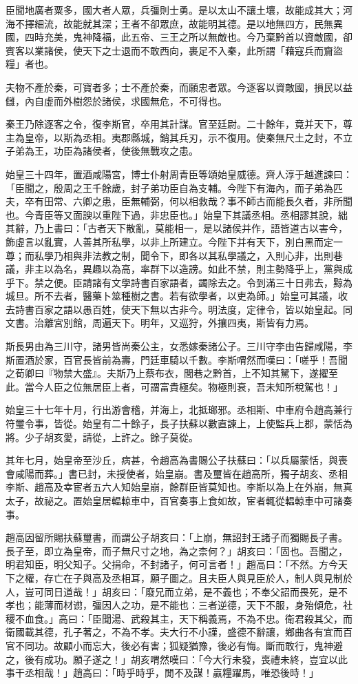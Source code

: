 \begin{pinyinscope}
臣聞地廣者粟多，國大者人眾，兵彊則士勇。是以太山不讓土壤，故能成其大；河海不擇細流，故能就其深；王者不卻眾庶，故能明其德。是以地無四方，民無異國，四時充美，鬼神降福，此五帝、三王之所以無敵也。今乃棄黔首以資敵國，卻賓客以業諸侯，使天下之士退而不敢西向，裹足不入秦，此所謂「藉寇兵而齎盜糧」者也。

夫物不產於秦，可寶者多；士不產於秦，而願忠者眾。今逐客以資敵國，損民以益讎，內自虛而外樹怨於諸侯，求國無危，不可得也。

秦王乃除逐客之令，復李斯官，卒用其計謀。官至廷尉。二十餘年，竟并天下，尊主為皇帝，以斯為丞相。夷郡縣城，銷其兵刃，示不復用。使秦無尺土之封，不立子弟為王，功臣為諸侯者，使後無戰攻之患。

始皇三十四年，置酒咸陽宮，博士仆射周青臣等頌始皇威德。齊人淳于越進諫曰：「臣聞之，殷周之王千餘歲，封子弟功臣自為支輔。今陛下有海內，而子弟為匹夫，卒有田常、六卿之患，臣無輔弼，何以相救哉？事不師古而能長久者，非所聞也。今青臣等又面諛以重陛下過，非忠臣也。」始皇下其議丞相。丞相謬其說，絀其辭，乃上書曰：「古者天下散亂，莫能相一，是以諸侯并作，語皆道古以害今，飾虛言以亂實，人善其所私學，以非上所建立。今陛下并有天下，別白黑而定一尊；而私學乃相與非法教之制，聞令下，即各以其私學議之，入則心非，出則巷議，非主以為名，異趣以為高，率群下以造謗。如此不禁，則主勢降乎上，黨與成乎下。禁之便。臣請諸有文學詩書百家語者，蠲除去之。令到滿三十日弗去，黥為城旦。所不去者，醫藥卜筮種樹之書。若有欲學者，以吏為師。」始皇可其議，收去詩書百家之語以愚百姓，使天下無以古非今。明法度，定律令，皆以始皇起。同文書。治離宮別館，周遍天下。明年，又巡狩，外攘四夷，斯皆有力焉。

斯長男由為三川守，諸男皆尚秦公主，女悉嫁秦諸公子。三川守李由告歸咸陽，李斯置酒於家，百官長皆前為壽，門廷車騎以千數。李斯喟然而嘆曰：「嗟乎！吾聞之荀卿曰『物禁大盛』。夫斯乃上蔡布衣，閭巷之黔首，上不知其駑下，遂擢至此。當今人臣之位無居臣上者，可謂富貴極矣。物極則衰，吾未知所稅駕也！」

始皇三十七年十月，行出游會稽，并海上，北抵瑯邪。丞相斯、中車府令趙高兼行符璽令事，皆從。始皇有二十餘子，長子扶蘇以數直諫上，上使監兵上郡，蒙恬為將。少子胡亥愛，請從，上許之。餘子莫從。

其年七月，始皇帝至沙丘，病甚，令趙高為書賜公子扶蘇曰：「以兵屬蒙恬，與喪會咸陽而葬。」書已封，未授使者，始皇崩。書及璽皆在趙高所，獨子胡亥、丞相李斯、趙高及幸宦者五六人知始皇崩，餘群臣皆莫知也。李斯以為上在外崩，無真太子，故祕之。置始皇居輼輬車中，百官奏事上食如故，宦者輒從輼輬車中可諸奏事。

趙高因留所賜扶蘇璽書，而謂公子胡亥曰：「上崩，無詔封王諸子而獨賜長子書。長子至，即立為皇帝，而子無尺寸之地，為之柰何？」胡亥曰：「固也。吾聞之，明君知臣，明父知子。父捐命，不封諸子，何可言者！」趙高曰：「不然。方今天下之權，存亡在子與高及丞相耳，願子圖之。且夫臣人與見臣於人，制人與見制於人，豈可同日道哉！」胡亥曰：「廢兄而立弟，是不義也；不奉父詔而畏死，是不孝也；能薄而材谫，彊因人之功，是不能也：三者逆德，天下不服，身殆傾危，社稷不血食。」高曰：「臣聞湯、武殺其主，天下稱義焉，不為不忠。衛君殺其父，而衛國載其德，孔子著之，不為不孝。夫大行不小謹，盛德不辭讓，鄉曲各有宜而百官不同功。故顧小而忘大，後必有害；狐疑猶豫，後必有悔。斷而敢行，鬼神避之，後有成功。願子遂之！」胡亥喟然嘆曰：「今大行未發，喪禮未終，豈宜以此事干丞相哉！」趙高曰：「時乎時乎，閒不及謀！贏糧躍馬，唯恐後時！」


\end{pinyinscope}
